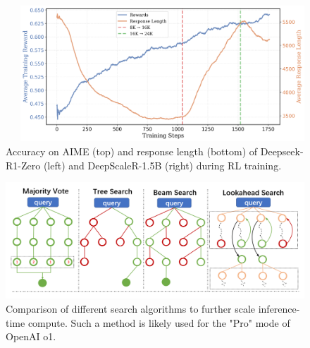 \documentclass[aspectratio=169]{beamer}
\begin{document}
\begin{frame}
\begin{figure}
\begin{columns}
\begin{column}{0.4\textwidth}
                \end{column}
                \begin{column}{0.45\textwidth}
                    \includegraphics[width=\linewidth]{images/deepscaler-reward-response-length}
                \end{column}
            \end{columns}
            \caption{Accuracy on AIME (top) and response length (bottom) of Deepseek-R1-Zero (left) and DeepScaleR-1.5B (right) during RL training.~\parencite{deepseekai2025, deepscaler2025}}
        \end{figure}
    \end{frame}
        \begin{frame}
        \begin{figure}
            \includegraphics[width=1\textwidth]{images/inference-time-search-algorithms}
            \caption{Comparison of different search algorithms to further scale inference-time compute. Such a method is likely used for the "Pro" mode of OpenAI o1.~\parencite{xu2025largereasoningmodelssurvey}}
        \end{figure}
    \end{frame}
\end{document}
